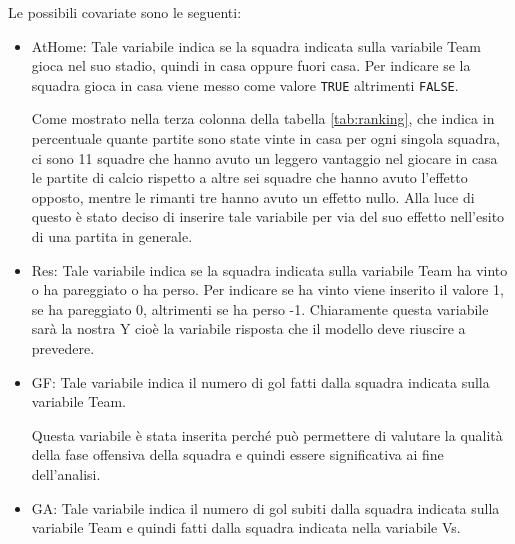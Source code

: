 Le possibili covariate sono le seguenti:
\begin{itemize}
	\item \textsf{AtHome}: Tale variabile indica se la squadra indicata sulla variabile \textsf{Team} gioca nel suo stadio, quindi in casa oppure fuori casa. Per indicare se la squadra gioca in casa viene messo come valore \texttt{TRUE} altrimenti \texttt{FALSE}. 
	
	Come mostrato nella terza colonna della tabella \ref{tab:ranking}, che indica in percentuale quante partite sono state vinte in casa per ogni singola squadra, ci sono 11 squadre che hanno avuto un leggero vantaggio nel giocare in casa le partite di calcio rispetto a altre sei squadre che hanno avuto l'effetto opposto, mentre le rimanti tre hanno avuto un effetto nullo. Alla luce di questo è stato deciso di inserire tale variabile per via del suo effetto nell'esito di una partita in generale.
	\item \textsf{Res}: Tale variabile indica se la squadra indicata sulla variabile \textsf{Team} ha vinto o ha pareggiato o ha perso. Per indicare se ha vinto viene inserito il valore 1, se ha pareggiato 0, altrimenti se ha perso -1. Chiaramente questa variabile sarà la nostra Y cioè la variabile risposta che il modello deve riuscire a prevedere.
	\item \textsf{GF}: Tale variabile indica il numero di gol fatti dalla squadra indicata sulla variabile \textsf{Team}. 
	
	Questa variabile è stata inserita perché può permettere di valutare la qualità della fase offensiva della squadra e quindi essere significativa ai fine dell'analisi.
	\item \textsf{GA}: Tale variabile indica il numero di gol subiti dalla squadra indicata sulla variabile \textsf{Team} e quindi fatti dalla squadra indicata nella variabile \textsf{Vs}. 
	

\end{itemize}
